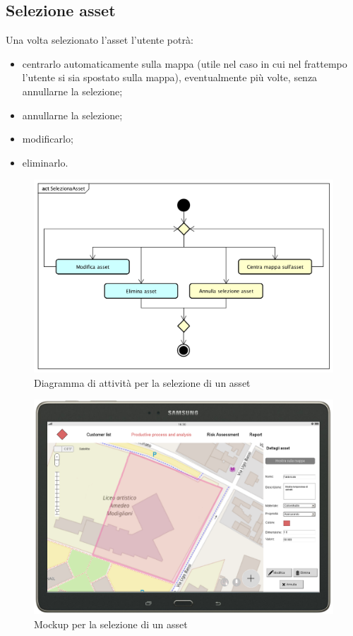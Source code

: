 \subsection{Selezione asset}
Una volta selezionato l'asset l'utente potrà:
\begin{itemize}
	\item centrarlo automaticamente sulla mappa (utile nel caso in cui nel frattempo l'utente si sia spostato sulla mappa), eventualmente più volte, senza annullarne la selezione;
	\item annullarne la selezione;
	\item modificarlo;
	\item eliminarlo.
\end{itemize}
\begin{figure}[H]
	\centering
	\includegraphics[width=\textwidth]{img/DiagrammiDiAttivita/SelezioneAsset.png}
	\caption{Diagramma di attività per la selezione di un asset}
\end{figure}
\label{7_Visualizza_un_asset}
\begin{figure}[H]
	\centering
	\includegraphics[width=\textwidth]{img/MockUp/m7.png}
	\caption{Mockup per la selezione di un asset}
\end{figure}

